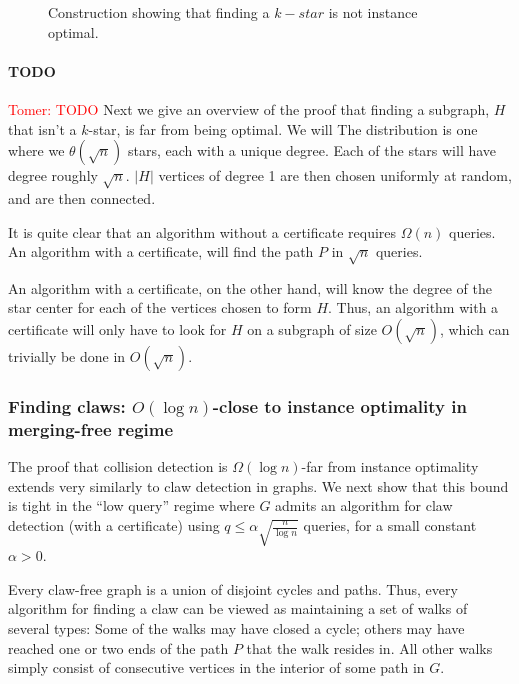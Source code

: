 \documentclass[11pt]{article}
\numberwithin{equation}{section}
\newcommand{\kstar}[1]{\ensuremath{#1}-star}
\newcommand{\1}{\mathbf{1}}
\newcommand\tomer[1]{{\textcolor{red}{Tomer: #1}}}
\begin{document}
{\begin{figure}
\begin{center}
 \caption{Construction showing that finding a $\kstar{k}$ is not instance optimal. \label{fig:pathsIntro}}
\end{center}
\end{figure}


\paragraph{TODO} \tomer{TODO}
Next we give an overview of the proof that finding a subgraph, $H$ that isn't a \kstar{k}, is far from being optimal. We will The distribution is one where we $\theta(\sqrt{n})$ stars, each with a unique degree. Each of the stars will have degree roughly $\sqrt{n}$. $|H|$ vertices of degree 1 are then chosen uniformly at random, and are then connected.

It is quite clear that an algorithm without a certificate requires $\Omega(n)$ queries. An algorithm with a certificate, will find the path $P$ in $\sqrt{n}$ queries.

An algorithm with a certificate, on the other hand, will know the degree of the star center for each of the vertices chosen to form $H$. Thus, an algorithm with a certificate will only have to look for $H$ on a subgraph of size $O(\sqrt{n})$, which can trivially be done in $O(\sqrt{n})$.
}

\subsubsection{Finding claws: $O(\log n)$-close to instance optimality in merging-free regime}
The proof that collision detection is $\Omega(\log n)$-far from instance optimality extends very similarly to claw detection in graphs. We next show that this bound is tight in the ``low query'' regime where $G$ admits an algorithm for claw detection (with a certificate) using $q \leq \alpha \sqrt{\frac{n}{\log n}}$ queries, for a small constant $\alpha > 0$.

Every claw-free graph is a union of disjoint cycles and paths. Thus, every algorithm for finding a claw can be viewed as maintaining a set of walks of several types: Some of the walks may have closed a cycle; others may have reached one or two ends of the path $P$ that the walk resides in. All other walks simply consist of consecutive vertices in the interior of some path in $G$. 
\end{document}

